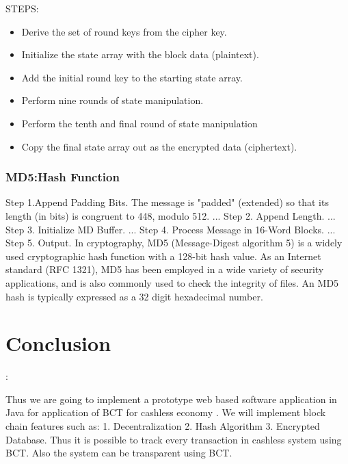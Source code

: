 \documentclass[oneside,a4paper,12pt]{report}
\begin{document}
{STEPS:\newline


\begin{itemize}
\item Derive the set of round keys from the cipher key.
\item Initialize the state array with the block data (plaintext).
\item Add the initial round key to the starting state array.
\item Perform nine rounds of state manipulation.\newline
\item Perform the tenth and final round of state manipulation
\item Copy the final state array out as the encrypted data (ciphertext).

\end{itemize}

\subsection{MD5:Hash Function} 

Step 1.Append Padding Bits. The message is "padded" (extended) so that its length (in bits) is congruent to 448, modulo 512. ...\newline
Step 2. Append Length. ...\newline
Step 3. Initialize MD Buffer. ...\newline
Step 4. Process Message in 16-Word Blocks. ...\newline
Step 5. Output.\newline
In cryptography, MD5 (Message-Digest algorithm 5) is a widely used cryptographic hash function with a 128-bit hash value. \newline
As an Internet standard (RFC 1321), MD5 has been employed in a wide variety of security applications, and is also commonly used to check the integrity of files. 
An MD5 hash is typically expressed as a 32 digit hexadecimal number.



\chapter{Conclusion}:

Thus we are going to implement a prototype web based software application in Java for application of BCT for cashless economy . We will implement  block chain features such as:
1.	Decentralization
2.	Hash Algorithm
3.	Encrypted Database.
Thus it is possible to track every transaction in cashless system using BCT. Also the system can be transparent using BCT. 

}
\end{document}
